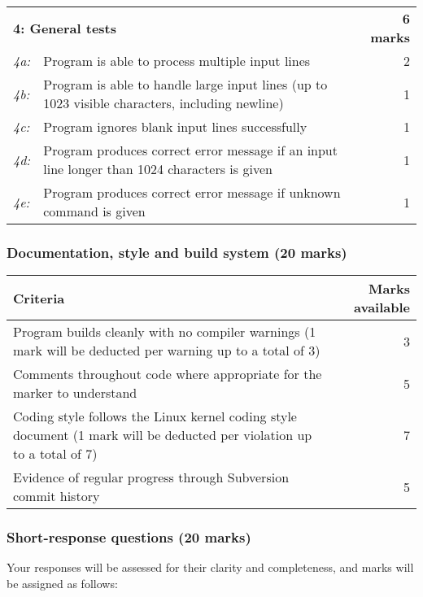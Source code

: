 \documentclass[12pt,a4paper]{article}
\begin{document}
\begin{longtable}{l p{12cm} r}
    & & \\ \midrule \multicolumn{2}{l}{\textbf{4: General tests}} & \textbf{6 marks} \\
    \textit{4a:} & Program is able to process multiple input lines & 2 \\
    \textit{4b:} & Program is able to handle large input lines (up to 1023 visible characters, including newline) & 1 \\
    \textit{4c:} & Program ignores blank input lines successfully & 1 \\
    \textit{4d:} & Program produces correct error message if an input line longer than 1024 characters is given & 1 \\
    \textit{4e:} & Program produces correct error message if unknown command is given & 1 \\

    \bottomrule \end{longtable}

\subsubsection*{Documentation, style and build system (20 marks)}

\begin{longtable}{p{13cm} r} \toprule \textbf{Criteria} & \textbf{Marks available} \\

    \midrule Program builds cleanly with no compiler warnings (1 mark will be deducted per warning up to a total of 3) & 3 \\ 
    Comments throughout code where appropriate for the marker to understand & 5 \\
    Coding style follows the Linux kernel coding style document (1 mark will be deducted per violation up to a total of 7) & 7 \\
    Evidence of regular progress through Subversion commit history & 5 \\

    \bottomrule \end{longtable}

\subsubsection*{Short-response questions (20 marks)}

Your responses will be assessed for their clarity and completeness, and marks
will be assigned as follows:
\end{document}
